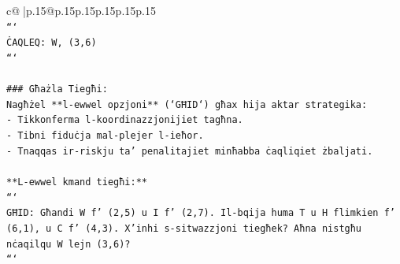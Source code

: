 \documentclass{article}
\begin{document}
{\begin{supertabular}{c@{$\;$}|p{.15\linewidth}@{}p{.15\linewidth}p{.15\linewidth}p{.15\linewidth}p{.15\linewidth}p{.15\linewidth}}
{{{\\ 
\texttt{```} \\
\texttt{ĊAQLEQ: W, (3,6)} \\
\texttt{```} \\
\\ 
\texttt{\#\#\# Għażla Tiegħi:} \\
\texttt{Nagħżel **l{-}ewwel opzjoni** (`GĦID`) għax hija aktar strategika:} \\
\texttt{{-} Tikkonferma l{-}koordinazzjonijiet tagħna.} \\
\texttt{{-} Tibni fiduċja mal{-}plejer l{-}ieħor.} \\
\texttt{{-} Tnaqqas ir{-}riskju ta' penalitajiet minħabba ċaqliqiet żbaljati.} \\
\\ 
\texttt{**L{-}ewwel kmand tiegħi:**} \\
\texttt{```} \\
\texttt{GĦID: Għandi W f' (2,5) u I f' (2,7). Il{-}bqija huma T u H flimkien f' (6,1), u C f' (4,3). X'inhi s{-}sitwazzjoni tiegħek? Aħna nistgħu nċaqilqu W lejn (3,6)?} \\
\texttt{```} \\
            }
        }
    }
     \\ \\


\end{supertabular}}
\end{document}
